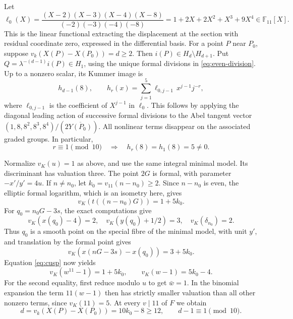 \documentclass[11pt,reqno]{amsart}
\newcommand{\F}{\mathbb F}\newcommand{\OO}{\mathcal O}
\theoremstyle{definition}\newtheorem{definition}[theorem]{Definition}
\theoremstyle{remark}\newtheorem{remark}[theorem]{Remark}
\numberwithin{equation}{section}
\begin{document}
Let
\[
 \ell_0(X)=\frac{(X-2)(X-3)(X-4)(X-8)}{(-2)(-3)(-4)(-8)}
 =1+2X+2X^2+X^3+9X^4\in\F_{11}[X].
\]
This is the linear functional extracting the displacement at the section
with residual coordinate zero, expressed in the differential basis.
For a point \(P\) near \(P_0\), suppose \(v_k(X(P)-X(P_0))=d\ge2\).
Then \(i(P)\in H_d\setminus H_{d+1}\). Put
\(Q=\lambda^{-(d-1)}i(P)\in H_1\), using the unique formal divisions
in \eqref{eq:even-division}. Up to a nonzero scalar, its Kummer image is
\begin{equation}\label{eq:leading}
 h_{d-1}(8),\qquad
 h_r(x)=\sum_{j=1}^5\ell_{0,j-1}\,x^{j-1}j^{-r},
\end{equation}
where \(\ell_{0,j-1}\) is the coefficient of \(X^{j-1}\) in \(\ell_0\).
This follows by applying the diagonal leading action of successive
formal divisions to the Abel tangent vector
\((1,8,8^2,8^3,8^4)/(2\overline{Y(P_0)})\).
All nonlinear terms disappear on the associated graded groups.
In particular,
\begin{equation}\label{eq:five}
 r\equiv1\pmod{10}\quad\Longrightarrow\quad h_r(8)=h_1(8)=5\ne0.
\end{equation}

Normalize \(v_K(u)=1\) as above, and use the same integral minimal model.
Its discriminant has valuation three. The point \(2G\) is formal, with
parameter \(-x'/y'=4u\). If \(n\ne n_0\), let
\(k_0=v_{11}(n-n_0)\ge2\). Since \(n-n_0\) is even, the elliptic
formal logarithm, which is an isometry here, gives
\[
 v_K(t((n-n_0)G))=1+5k_0.
\]
For \(q_0=n_0G-3s\), the exact computations give
\[
 v_K(x(q_0)-4)=2,\quad v_K(y(q_0)+1/2)=3,
 \quad v_K(\delta_{n_0})=2.
\]
Thus \(q_0\) is a smooth point on the special fibre of the minimal
model, with unit \(y'\), and translation by the formal point gives
\[
 v_K(x(nG-3s)-x(q_0))=3+5k_0.
\]
Equation \eqref{eq:cusp} now yields
\[
 v_K(w^{11}-1)=1+5k_0,
 \qquad v_K(w-1)=5k_0-4.
\]
For the second equality, first reduce modulo \(u\) to get \(\bar w=1\).
In the binomial expansion the term \(11(w-1)\) then has strictly
smaller valuation than all other nonzero terms, since \(v_K(11)=5\).
At every \(v\mid11\) of \(F\) we obtain
\begin{equation}\label{eq:d}
 d=v_k(X(P)-X(P_0))=10k_0-8\ge12,
 \qquad d-1\equiv1\pmod{10}.
\end{equation}
\end{document}
